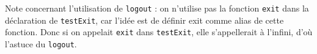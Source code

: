 \par Note concernant l'utilisation de \texttt{logout} : on n'utilise pas la fonction \texttt{exit} dans la déclaration de \texttt{testExit}, car l'idée est de définir exit comme alias de cette fonction. Donc si on appelait \texttt{exit} dans \texttt{testExit}, elle s'appellerait à l'infini, d'où l'astuce du \texttt{logout}.

